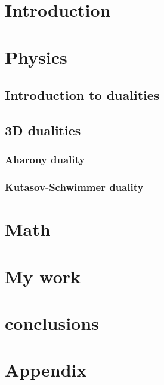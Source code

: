 


\maketitle
\chapter{Introduction}


\chapter{Physics}


\section{Introduction to dualities}





\section{3D dualities}

\subsection{Aharony duality}
\subsection{Kutasov-Schwimmer duality}


\chapter{Math}


\chapter{My work}


\chapter{conclusions}

\chapter{Appendix}


